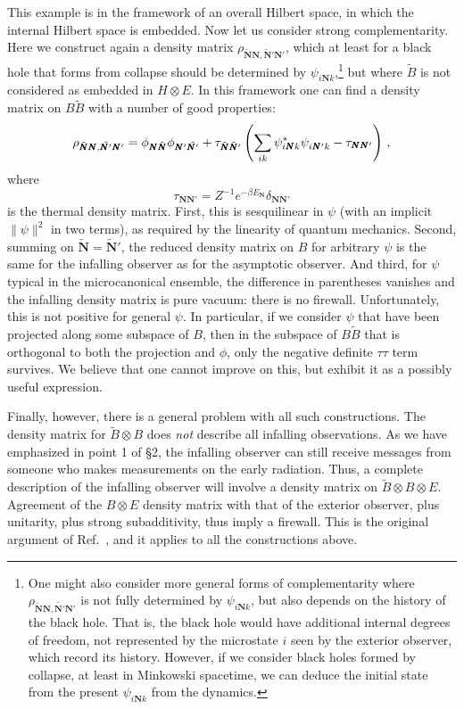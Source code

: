 \documentclass[12pt]{article}
\newcommand{\be}{\begin{equation}}
\newcommand{\ee}{\end{equation}}
\begin{document}
{This example is in the framework of an overall Hilbert space, in which the internal Hilbert space is embedded.  Now let us consider strong complementarity.   Here we construct again a density matrix $\rho_{\tilde{\pmb N} \pmb N,\tilde{\pmb N}' \pmb N'}$, which at least for a black hole that forms from collapse should be determined by $\psi_{i\pmb N k}$,\footnote{One might also consider more general forms of complementarity where $\rho_{\tilde{\pmb N} \pmb N,\tilde{\pmb N'} \pmb N'}$ is not fully determined by $\psi_{i\pmb N k}$, but also depends on the history of the black hole.  That is, the black hole would have additional internal degrees of freedom, not represented by the microstate $i$ seen by the exterior observer, which record its history.  However, if we consider black holes formed by collapse, at least in Minkowski spacetime, we can deduce the initial state from the present $\psi_{i\pmb N k}$ from the dynamics.} but where $\tilde B$ is not considered as embedded in $H \otimes E$.  {In this framework one can find a density matrix on $B\tilde B$ with a number of good properties:
\be
\rho_{\tilde{\pmb N} \pmb N,\tilde{\pmb N'} \pmb N'} = \phi_{\pmb N \tilde{\pmb N}}\phi_{\pmb N' \tilde{\pmb N{}'}}
+ \tau_{\tilde {\pmb N}\tilde {\pmb N}{}'} \left( \sum_{ik} \psi^*_{i\pmb N k} \psi^{\vphantom*}_{i\pmb N'k} - \tau_{\pmb N\pmb N'}
\right) \,,  \label{dmstrong}
\ee
where
\be
\tau_{ \pmb N\pmb N'} = Z^{-1} e^{-\beta{E_{\pmb N}}} \delta_{ \pmb N\pmb N'}
\ee
is the thermal density matrix.
First, this is sesquilinear in $\psi$ (with an implicit $\|\psi\|^2$ in two terms), as required by the linearity of quantum mechanics.
Second, summing on $\tilde {\pmb N} = \tilde {\pmb N}{}'$, the reduced density matrix on $B$ for arbitrary $\psi$ is the same for the infalling observer as for the asymptotic observer.  And third, for $\psi$ typical in the microcanonical ensemble, the difference in parentheses vanishes and the infalling density matrix is pure vacuum: there is no firewall.  Unfortunately, this is not positive for general $\psi$.  In particular, if we consider $\psi$ that have been projected along some subspace of $B$, then in the subspace of $B\tilde B$ that is orthogonal to both the projection and $\phi$, only the negative definite $\tau\tau$ term survives.  We believe that one cannot improve on this, but exhibit it as a possibly useful expression.}





Finally, however, there is a general problem with all such constructions.  The density matrix for $\tilde B \otimes B$ does {\it not} describe all infalling observations.  As we have emphasized in point 1 of \S2, the infalling observer can still receive messages from someone who makes measurements on the early radiation.  Thus, a complete description of the infalling observer will involve a density matrix on $\tilde B \otimes B \otimes E$.
Agreement of the $B \otimes E$ density matrix with that of the exterior observer, plus unitarity, plus strong subadditivity, thus imply a firewall.  This is the original argument of Ref.~\cite{Almheiri:2012rt}, and it applies to all the constructions above.



}
\end{document}
